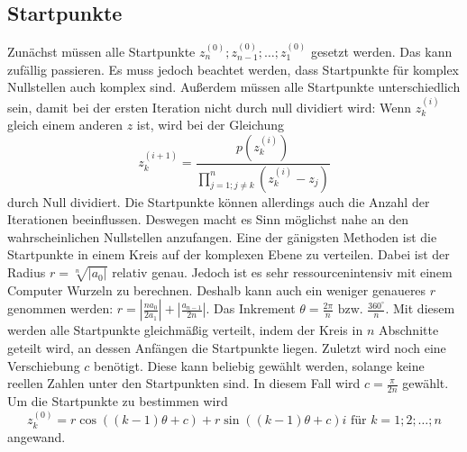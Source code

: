 \documentclass[12pt]{article}
\begin{document}
\subsection{Startpunkte}
Zunächst müssen alle Startpunkte $z_n^{(0)};z_{n-1}^{(0)};\dots;z_1^{(0)}$ gesetzt werden. Das kann zufällig passieren. Es muss jedoch beachtet werden, dass Startpunkte für komplex Nullstellen auch komplex sind. Außerdem müssen alle Startpunkte unterschiedlich sein, damit bei der ersten Iteration nicht durch null dividiert wird: 
Wenn $z_{k}^{(i)}$ gleich einem anderen $z$ ist, wird bei der Gleichung
\begin{equation*}
    z_k^{(i+1)} = \frac{p(z_{k}^{(i)})}{\prod_{j=1;j\neq k}^{n}(z_{k}^{(i)}-z_j)}
\end{equation*}
durch Null dividiert.
Die Startpunkte können allerdings auch die Anzahl der Iterationen beeinflussen. Deswegen macht es Sinn möglichst nahe an den wahrscheinlichen Nullstellen anzufangen. Eine der gänigsten Methoden ist die Startpunkte in einem Kreis auf der komplexen Ebene zu verteilen. Dabei ist der Radius $r = \sqrt[n]{|a_0|}$ relativ genau. Jedoch ist es sehr ressourcenintensiv mit einem Computer Wurzeln zu berechnen. Deshalb kann auch ein weniger genaueres $r$ genommen werden: $r = |\frac{na_0}{2a_1}| + |\frac{a_{n-1}}{2n}|$.
Das Inkrement $\theta = \frac{2\pi}{n} \text{ bzw. } \frac{360^\circ}{n}$. Mit diesem werden alle Startpunkte gleichmäßig verteilt, indem der Kreis in $n$ Abschnitte geteilt wird, an dessen Anfängen die Startpunkte liegen. Zuletzt wird noch eine Verschiebung $c$ benötigt. Diese kann beliebig gewählt werden, solange keine reellen Zahlen unter den Startpunkten sind. In diesem Fall wird $c = \frac{\pi}{2n}$ gewählt.
Um die Startpunkte zu bestimmen wird 
\[z_{k}^{(0)} = r\cos((k-1)\theta+c)+r\sin((k-1)\theta+c)i \text{ für } k=1;2;\dots;n\]
 angewand.
\end{document}
